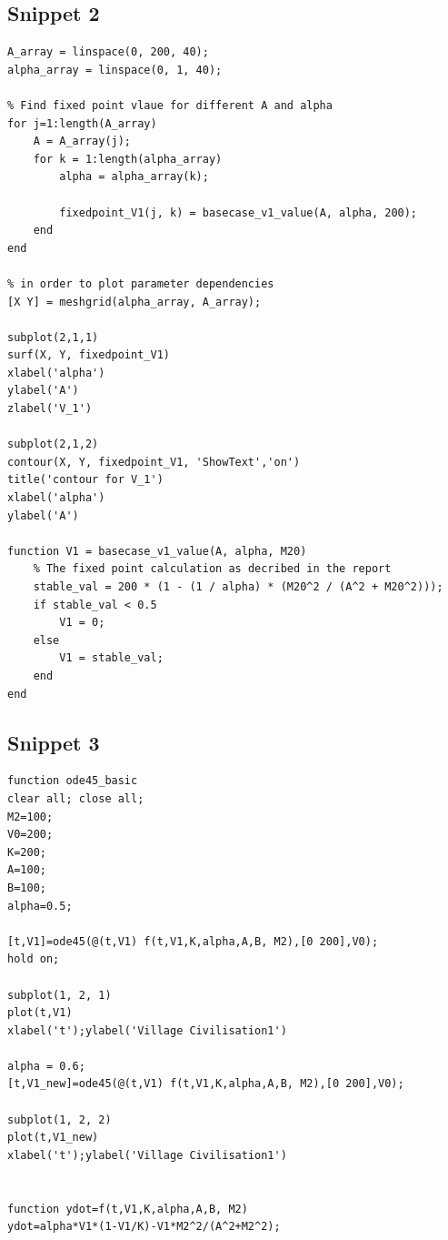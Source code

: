 \documentclass[12pt]{article}
\begin{document}
\subsection{Snippet 2}
\begin{verbatim}
A_array = linspace(0, 200, 40);
alpha_array = linspace(0, 1, 40);

% Find fixed point vlaue for different A and alpha
for j=1:length(A_array)
    A = A_array(j);
    for k = 1:length(alpha_array)
        alpha = alpha_array(k);
        
        fixedpoint_V1(j, k) = basecase_v1_value(A, alpha, 200);
    end 
end

% in order to plot parameter dependencies
[X Y] = meshgrid(alpha_array, A_array);

subplot(2,1,1)
surf(X, Y, fixedpoint_V1)
xlabel('alpha')
ylabel('A')
zlabel('V_1')

subplot(2,1,2)
contour(X, Y, fixedpoint_V1, 'ShowText','on')
title('contour for V_1')
xlabel('alpha')
ylabel('A')

function V1 = basecase_v1_value(A, alpha, M20)
    % The fixed point calculation as decribed in the report
    stable_val = 200 * (1 - (1 / alpha) * (M20^2 / (A^2 + M20^2)));
    if stable_val < 0.5
        V1 = 0;
    else
        V1 = stable_val;
    end
end
\end{verbatim}

\subsection{Snippet 3}
\begin{verbatim}
function ode45_basic
clear all; close all;
M2=100;
V0=200;
K=200;
A=100;
B=100;
alpha=0.5;

[t,V1]=ode45(@(t,V1) f(t,V1,K,alpha,A,B, M2),[0 200],V0);
hold on;

subplot(1, 2, 1)
plot(t,V1)
xlabel('t');ylabel('Village Civilisation1')

alpha = 0.6;
[t,V1_new]=ode45(@(t,V1) f(t,V1,K,alpha,A,B, M2),[0 200],V0);

subplot(1, 2, 2)
plot(t,V1_new)
xlabel('t');ylabel('Village Civilisation1')


function ydot=f(t,V1,K,alpha,A,B, M2)
ydot=alpha*V1*(1-V1/K)-V1*M2^2/(A^2+M2^2);
\end{verbatim}
\end{document}
